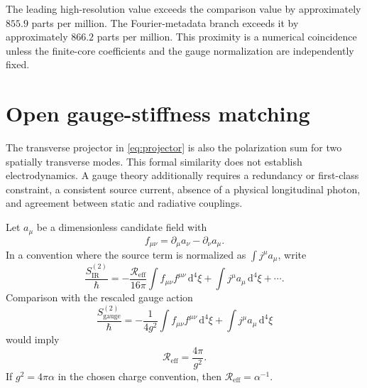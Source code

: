 \documentclass[aps,pre,preprint,notitlepage,nofootinbib,superscriptaddress]{revtex4-2}
\newcommand{\dd}{\mathrm d}
\newcommand{\Reff}{\mathscr R_{\mathrm{eff}}}
\begin{document}
The leading high-resolution value exceeds the comparison value by approximately $855.9$ parts per million.  The Fourier-metadata branch exceeds it by approximately $866.2$ parts per million.  This proximity is a numerical coincidence unless the finite-core coefficients and the gauge normalization are independently fixed.

\section{Open gauge-stiffness matching}
\label{sec:gauge}

The transverse projector in \cref{eq:projector} is also the polarization sum for two spatially transverse modes.  This formal similarity does not establish electrodynamics.  A gauge theory additionally requires a redundancy or first-class constraint, a consistent source current, absence of a physical longitudinal photon, and agreement between static and radiative couplings.

Let $a_\mu$ be a dimensionless candidate field with
\begin{equation}
  f_{\mu\nu}=\partial_\mu a_\nu-\partial_\nu a_\mu.
\end{equation}
In a convention where the source term is normalized as $\int j^\mu a_\mu$, write
\begin{equation}
  \frac{S_{\mathrm{IR}}^{(2)}}{\hbar}
  =-\frac{\Reff}{16\pi}
   \int f_{\mu\nu}f^{\mu\nu}\,\dd^4\xi
   +\int j^\mu a_\mu\,\dd^4\xi+\cdots.
  \label{eq:IR-action}
\end{equation}
Comparison with the rescaled gauge action
\begin{equation}
  \frac{S_{\mathrm{gauge}}^{(2)}}{\hbar}
  =-\frac{1}{4g^2}\int f_{\mu\nu}f^{\mu\nu}\,\dd^4\xi
   +\int j^\mu a_\mu\,\dd^4\xi
  \label{eq:gauge-action}
\end{equation}
would imply
\begin{equation}
  \Reff=\frac{4\pi}{g^2}.
  \label{eq:stiffness}
\end{equation}
If $g^2=4\pi\alpha$ in the chosen charge convention, then $\Reff=\alpha^{-1}$.
\end{document}
